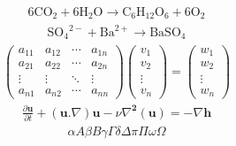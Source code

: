 \documentclass{article}
\begin{document}
\begin{align*}
\mathrm{6CO_2 + 6H_2O \rightarrow C_6H_{12}O_6 + 6O_2}
\end{align*}
\begin{align*}
\mathrm{{SO_4}^{2-} + {Ba}^{2+} \rightarrow BaSO_4}
\end{align*}
\begin{align*}
 \begin{pmatrix}
  a_{11} & a_{12} & \cdots & a_{1n}\\ 
  a_{21} & a_{22} & \cdots & a_{2n}\\
  \vdots & \vdots & \ddots & \vdots\\
  a_{n1} & a_{n2} & \cdots & a_{nn}
\end{pmatrix}
 \begin{pmatrix}
  v_1\\ 
  v_2\\
  \vdots\\
  v_n
\end{pmatrix}
=
 \begin{pmatrix}
  w_1\\ 
  w_2\\
  \vdots\\
  w_n
\end{pmatrix} 
\end{align*}
\begin{align*}
		\frac{\partial \textbf{u}}{\partial t} + (\textbf{u}.\nabla)\textbf{u} - \nu{\nabla}^{\textbf{2}}(\textbf{u}) = -\nabla{\textbf{h}}
\end{align*}
\begin{align*}
{\alpha}{A}{\beta}{B}{\gamma}{\Gamma}{\delta}{\Delta}{\pi}{\Pi}{\omega}{\Omega}
\end{align*}
\end{document}

